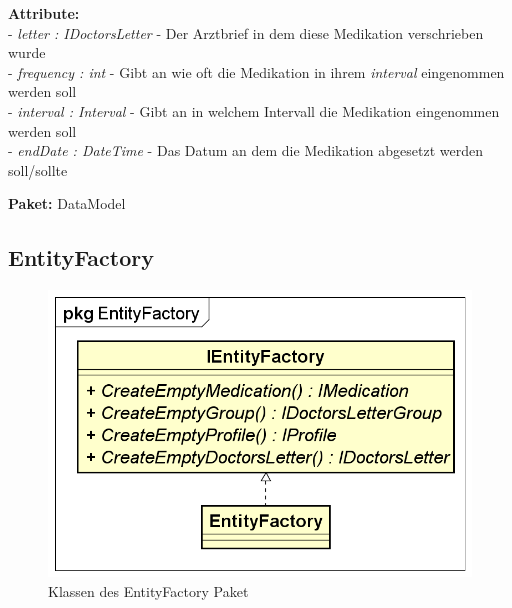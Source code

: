 \documentclass[a4paper]{scrreprt}
\begin{document}
\textbf{Attribute:}\\
- \textit{letter : IDoctorsLetter} - Der Arztbrief in dem diese Medikation verschrieben wurde\\
- \textit{frequency : int} - Gibt an wie oft die Medikation in ihrem \textit{interval} eingenommen werden soll\\
- \textit{interval : Interval} - Gibt an in welchem Intervall die Medikation eingenommen werden soll\\
- \textit{endDate : DateTime} - Das Datum an dem die Medikation abgesetzt werden soll/sollte

\textbf{Paket:} DataModel

\subsection{EntityFactory}
\begin{figure}[H]
\centering
\includegraphics[width=0.75\textheight]{graphics/Klassendiagramme/Model/EntityFactoryPackage.png}
\caption{Klassen des EntityFactory Paket}
\end{figure}
\end{document}
